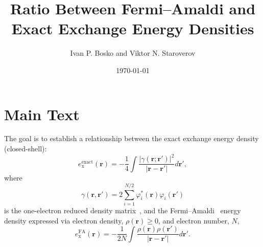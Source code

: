 \documentclass[%
 reprint,
 amsmath,amssymb,
 aps,
pra,
]{revtex4-2}
\begin{document}
\title{Ratio Between Fermi--Amaldi and Exact Exchange Energy Densities}

\author{Ivan P. Bosko and Viktor N. Staroverov}
%

\date{\today}

\begin{abstract}

\end{abstract}
\maketitle

\section{Main Text}

The goal is to establish a relationship between the exact exchange energy density (closed-shell):
\begin{equation}\label{eq: Exact EXX Energy Density}
    e_{\text{x}}^{\text{exact}}(\mathbf{r})
    =
    -
    \frac{1}{4}
    \int
    \frac{|\gamma(\mathbf{r};\mathbf{r}')|^2}
    {|\mathbf{r}-\mathbf{r}'|}
    d\mathbf{r}',
\end{equation}
where 
\begin{equation}
    \gamma(\mathbf{r},\mathbf{r}')
    =
    2\sum^{N/2}_{i=1}
    \varphi^*_i(\mathbf{r})\varphi_i(\mathbf{r}')
\end{equation}
is the one-electron reduced density matrix~\cite{Staroverov.2012.Matter,Parr.1989.density}, and the Fermi--Amaldi~\cite{Fermi.1934.MRAI.6.117,Benilan.1992.186.25} energy density expressed via electron density, $\rho(\mathbf{r})\geq 0$, and electron number, $N$,
\begin{equation}\label{eq: FA Energy Density}
    e_{\text{x}}^{\text{FA}}(\mathbf{r})
    =
    -
    \frac{1}{2N}
    \int
    \frac
    {\rho(\mathbf{r})\rho(\mathbf{r}')}
    {|\mathbf{r}-\mathbf{r}'|}
    d\mathbf{r}'.
\end{equation}
\end{document}
